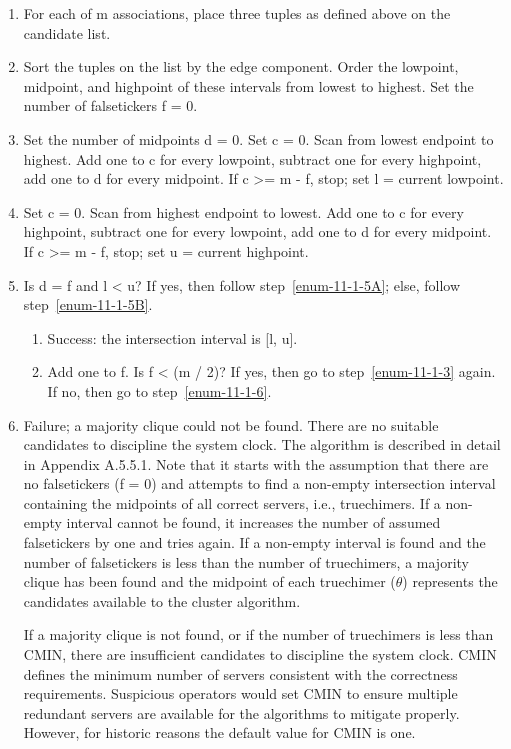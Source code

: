 \begin{enumerate}
  \item For each of m associations, place three tuples as defined above
    on the candidate list.

  \item Sort the tuples on the list by the edge component. Order the
    lowpoint, midpoint, and highpoint of these intervals from lowest to
    highest. Set the number of falsetickers f = 0.

  \item \label{enum-11-1-3} Set the number of midpoints d = 0. Set c = 0. Scan from lowest
    endpoint to highest. Add one to c for every lowpoint, subtract one
    for every highpoint, add one to d for every midpoint. If c >= m - f,
    stop; set l = current lowpoint.

  \item Set c = 0. Scan from highest endpoint to lowest. Add one to c
    for every highpoint, subtract one for every lowpoint, add one to d
    for every midpoint. If c >= m - f, stop; set u = current highpoint.

  \item \label{enum-11-1-5} Is d = f and l < u? If yes, then follow step~\ref{enum-11-1-5A}; else, follow
    step~\ref{enum-11-1-5B}.

    \begin{enumerate}
      \item \label{enum-11-1-5A} Success: the intersection interval is [l, u].

      \item \label{enum-11-1-5B} Add one to f. Is f < (m / 2)? If yes, then go to step~\ref{enum-11-1-3} again.
        If no, then go to step~\ref{enum-11-1-6}.
    \end{enumerate}

  \item \label{enum-11-1-6} Failure; a majority clique could not be found. There are no
    suitable candidates to discipline the system clock.
    The algorithm is described in detail in Appendix A.5.5.1. Note that
    it starts with the assumption that there are no falsetickers (f = 0)
    and attempts to find a non-empty intersection interval containing the
    midpoints of all correct servers, i.e., truechimers. If a non-empty
    interval cannot be found, it increases the number of assumed
    falsetickers by one and tries again. If a non-empty interval is
    found and the number of falsetickers is less than the number of
    truechimers, a majority clique has been found and the midpoint of
    each truechimer ($ \theta $) represents the candidates available to the
    cluster algorithm.

    If a majority clique is not found, or if the number of truechimers is
    less than CMIN, there are insufficient candidates to discipline the
    system clock. CMIN defines the minimum number of servers consistent
    with the correctness requirements. Suspicious operators would set
    CMIN to ensure multiple redundant servers are available for the
    algorithms to mitigate properly. However, for historic reasons the
    default value for CMIN is one.
\end{enumerate}

